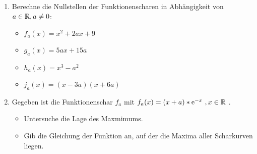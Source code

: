 






\begin{enumerate}
  \item Berechne die Nullstellen der Funktionenscharen in Abhängigkeit von $a\in \mathbb{R}, a\neq 0$:
  \begin{itemize}
    \item $f_a(x)=x^2+2ax+9$
    \item $g_a(x)=5ax+15a$
    \item $h_a(x)=x^3-a^2$
    \item $j_a(x)=(x-3a)(x+6a)$
  \end{itemize}
  \item Gegeben ist die Funktionenschar $f_a$ mit $f_a(x)=(x+a)*\mathrm{e}^{-x}\ , x\in \mathbb{R}$ .
  \begin{itemize}
    \item Untersuche die Lage des Maxmimums.
    \item Gib die Gleichung der Funktion an, auf der die Maxima aller Scharkurven liegen.
  \end{itemize}
\end{enumerate}
